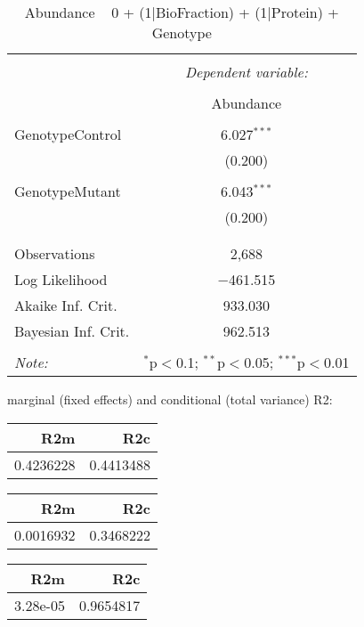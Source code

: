 \documentclass[11pt]{report}
\begin{document}
\begin{table}[!htbp] \centering 
  \caption{Abundance ~ 0 + (1|BioFraction) + (1|Protein) + Genotype} 
  \label{} 
\begin{tabular}{@{\extracolsep{5pt}}lc} 
\\[-1.8ex]\hline 
\hline \\[-1.8ex] 
 & \multicolumn{1}{c}{\textit{Dependent variable:}} \\ 
\cline{2-2} 
\\[-1.8ex] & Abundance \\ 
\hline \\[-1.8ex] 
 GenotypeControl & 6.027$^{***}$ \\ 
  & (0.200) \\ 
  & \\ 
 GenotypeMutant & 6.043$^{***}$ \\ 
  & (0.200) \\ 
  & \\ 
\hline \\[-1.8ex] 
Observations & 2,688 \\ 
Log Likelihood & $-$461.515 \\ 
Akaike Inf. Crit. & 933.030 \\ 
Bayesian Inf. Crit. & 962.513 \\ 
\hline 
\hline \\[-1.8ex] 
\textit{Note:}  & \multicolumn{1}{r}{$^{*}$p$<$0.1; $^{**}$p$<$0.05; $^{***}$p$<$0.01} \\ 
\end{tabular} 
\end{table} 
marginal (fixed effects) and conditional (total variance) R2:

\begin{tabular}{r|r}
\hline
R2m & R2c\\
\hline
0.4236228 & 0.4413488\\
\hline
\end{tabular}

\begin{tabular}{r|r}
\hline
R2m & R2c\\
\hline
0.0016932 & 0.3468222\\
\hline
\end{tabular}

\begin{tabular}{r|r}
\hline
R2m & R2c\\
\hline
3.28e-05 & 0.9654817\\
\hline
\end{tabular}
\end{document}
